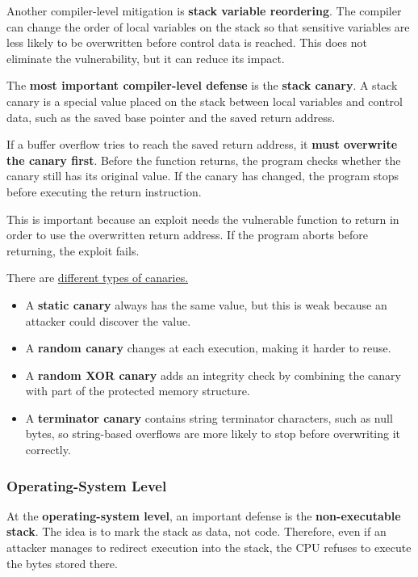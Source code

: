 \documentclass{article}
\begin{document}
Another compiler-level mitigation is \textbf{stack variable reordering}. The compiler can change the order of local variables on the stack so that sensitive variables are less likely to be overwritten before control data is reached. This does not eliminate the vulnerability, but it can reduce its impact.

The \textbf{most important compiler-level defense} is the \textbf{stack canary}. A stack canary is a special value placed on the stack between local variables and control data, such as the saved base pointer and the saved return address.

If a buffer overflow tries to reach the saved return address, it \textbf{must overwrite the canary first}. Before the function returns, the program checks whether the canary still has its original value. If the canary has changed, the program stops before executing the return instruction.

This is important because an exploit needs the vulnerable function to return in order to use the overwritten return address. If the program aborts before returning, the exploit fails.

There are \underline{different types of canaries.}

\begin{itemize}
\item A \textbf{static canary} always has the same value, but this is weak because an attacker could discover the value.
\item A \textbf{random canary} changes at each execution, making it harder to reuse.
\item A \textbf{random XOR canary} adds an integrity check by combining the canary with part of the protected memory structure.
\item A \textbf{terminator canary} contains string terminator characters, such as null bytes, so string-based overflows are more likely to stop before overwriting it correctly.
\end{itemize}

\subsubsection{Operating-System Level}

At the \textbf{operating-system level}, an important defense is the \textbf{non-executable stack}. The idea is to mark the stack as data, not code. Therefore, even if an attacker manages to redirect execution into the stack, the CPU refuses to execute the bytes stored there.
\end{document}
